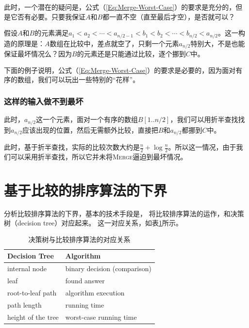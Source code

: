 此时，一个潜在的疑问是，公式（\ref{Eq:Merge-Worst-Case}）的要求是充分的，但是它否有必要。只要我保证$A$和$B$都一直不空（直至最后才空），是否就可以？

假设$A$和$B$的元素满足$a_1<a_2<\cdots < a_{n/2-1} < b_1<b_2<\cdots <b_{n/2}<a_{n/2}$。这一构造的原理是：$A$数组在比较中，差点就空了，只剩一个元素$a_{n/2}$特别大，不是也能保证最坏情况么？因为$B$的元素还是只能通过比较，逐个挪到$C$中。

下面的例子说明，公式（\ref{Eq:Merge-Worst-Case}）的要求是必要的，因为面对有序的数组，我们可以玩出一些特别的“花样”。

\subsubsection{这样的输入做不到最坏}

此时，$a_{n/2}$这一个元素，面对一个有序的数组$B[1..n/2]$，我们可以用折半查找找到$a_{n/2}$应该出现的位置，然后无需额外比较，直接把$B$和$a_{n/2}$都挪到$C$中。

此时，基于折半查找，实际的比较次数大约是$\frac{n}{2}+\log \frac{n}{2}$。所以这一情况，由于我们可以采用折半查找，所以它并未将\textsc{Merge}逼迫到最坏情况。



\section{基于比较的排序算法的下界} \label{sec:sorting-lb}

分析比较排序算法的下界，基本的技术手段是，
    将比较排序算法的运作，和决策树（decision tree）对应起来。
这一对应关系，如表\ref{tab:decision-tree}所示。

\begin{table}[htbp]
    \centering
    \caption{决策树与比较排序算法的对应关系}
    \label{tab:decision-tree}
    \setlength{\tabcolsep}{15pt} 
    \begin{tabular}{l|l}
        \toprule
        Decision Tree & Algorithm \\
        \midrule
        internal node       & binary decision (comparison) \\
        leaf                & found answer \\
        root-to-leaf path   & algorithm execution \\
        path length         & running time \\
        height of the tree  & worst-case running time \\
        \bottomrule
    \end{tabular}
\end{table}


